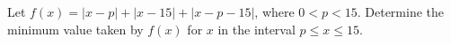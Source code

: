 Let $f(x) = |x - p| + |x - 15| + |x - p - 15|$, where $0 < p < 15$.  Determine the minimum value taken by $f(x)$ for $x$ in the interval $p \le x \le 15$.
